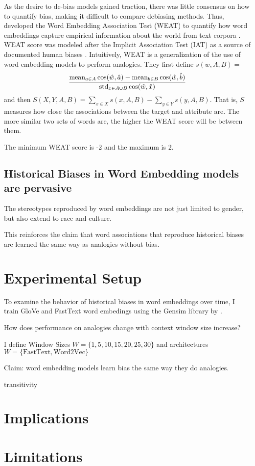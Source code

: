 \documentclass[11pt,a4paper]{article}
\begin{document}
As the desire to de-bias models gained traction, there was little consensus on
how to quantify bias, making it difficult to compare debiasing methods. Thus,
\citet{weat-1608-07187} developed the Word Embedding Association Test (WEAT) to
quantify how word embeddings capture empirical information about the world from
text corpora \citep[8]{weat-1608-07187}. WEAT score was modeled after the
Implicit Association Test (IAT) as a source of documented human biases
\citep[2]{weat-1608-07187}. Intuitively, WEAT is a generalization of the use of
word embedding models to perform analogies. They first define  $s(w, A,B)= $
$$\\ \frac{ \text{mean}_{a \in A} \cos(\hat{w}, \hat{a} ) - \text{mean}_{b \in
                    B} \cos(\hat{w}, \hat{b} ) } {\text{std}_{x\in A \cup B}
                    \cos(\hat{w}, \hat{x})}$$  and then $S(X,Y,A,B) = \sum_{x\in
                    X} s(x, A, B) -  \sum_{y\in Y} s(y, A, B)$. That is, $S$
                    measures how close the associations between the target and
                    attribute are. The more similar two sets of words are, the
                    higher the WEAT score will be between them.

The minimum WEAT score is -2 and the maximum is 2.

\subsection{Historical Biases in Word Embedding models are pervasive}

The stereotypes reproduced by word embeddings are not just limited to gender,
but also extend to race and culture.

This reinforces the claim that word associations that reproduce historical
biases are learned the same way as analogies without bias.

\section{Experimental Setup}

To examine the behavior of historical biases in word embeddings over time, I
train GloVe and FastText word embedings using the Gensim library by
\citet{rehurek_lrec}. 


How does performance on analogies change with context window size increase?

I define Window Sizes $W = \{1,5,10,15,20, 25, 30\}$ and architectures $W =
\{\text{FastText}, \text{Word2Vec} \}$

Claim: word embedding models learn bias the same way they do analogies.

transitivity 

\section{Implications}

\section{Limitations}






\end{document}
